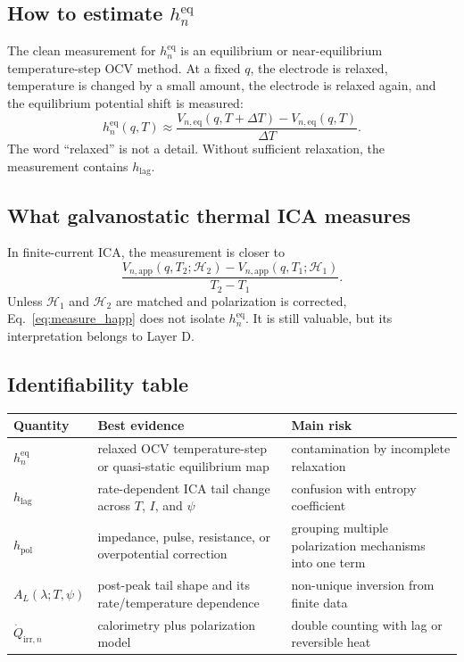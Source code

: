 \documentclass[11pt,a4paper]{article}
\newcommand{\eqs}{\mathrm{eq}}
\newcommand{\app}{\mathrm{app}}
\newcommand{\irr}{\mathrm{irr}}
\newcommand{\pol}{\mathrm{pol}}
\newcommand{\lag}{\mathrm{lag}}
\newcommand{\calH}{\mathcal H}
\begin{document}
\subsection{How to estimate \(h_n^{\eqs}\)}\label{sec:measure_eq}

The clean measurement for \(h_n^{\eqs}\) is an equilibrium or near-equilibrium temperature-step OCV method.
At a fixed \(q\), the electrode is relaxed, temperature is changed by a small amount, the electrode is relaxed
again, and the equilibrium potential shift is measured:
\begin{equation}
h_n^{\eqs}(q,T)
\approx
\frac{V_{n,\eqs}(q,T+\Delta T)-V_{n,\eqs}(q,T)}{\Delta T}.
\label{eq:measure_heq}
\end{equation}
The word ``relaxed'' is not a detail. Without sufficient relaxation, the measurement contains \(h_{\lag}\).

\subsection{What galvanostatic thermal ICA measures}\label{sec:measure_dyn}

In finite-current ICA, the measurement is closer to
\begin{equation}
\frac{V_{n,\app}(q,T_2;\calH_2)-V_{n,\app}(q,T_1;\calH_1)}{T_2-T_1}.
\label{eq:measure_happ}
\end{equation}
Unless \(\calH_1\) and \(\calH_2\) are matched and polarization is corrected, Eq.~\eqref{eq:measure_happ}
does not isolate \(h_n^{\eqs}\). It is still valuable, but its interpretation belongs to Layer D.

\subsection{Identifiability table}\label{sec:identifiability}

\begin{longtable}{@{}p{}p{}p{}@{}}
\toprule
Quantity & Best evidence & Main risk \\
\midrule
\endhead
\(h_n^{\eqs}\) & relaxed OCV temperature-step or quasi-static equilibrium map & contamination by incomplete relaxation \\
\(h_{\lag}\) & rate-dependent ICA tail change across \(T\), \(I\), and \(\psi\) & confusion with entropy coefficient \\
\(h_{\pol}\) & impedance, pulse, resistance, or overpotential correction & grouping multiple polarization mechanisms into one term \\
\(A_L(\lambda;T,\psi)\) & post-peak tail shape and its rate/temperature dependence & non-unique inversion from finite data \\
\(\dot Q_{\irr,n}\) & calorimetry plus polarization model & double counting with lag or reversible heat \\
\bottomrule
\end{longtable}
\end{document}
